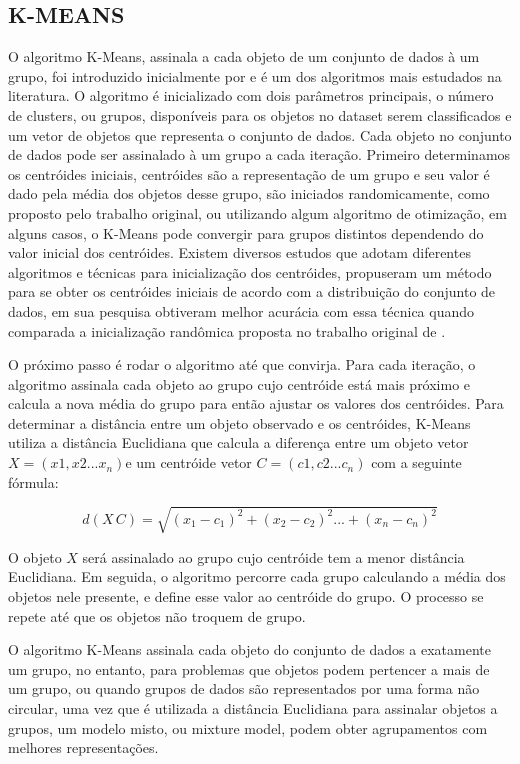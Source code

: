 \documentclass[12pt,a4paper]{article}
\begin{document}
\subsection{K-MEANS}
O algoritmo K-Means, assinala a cada objeto de um conjunto de dados à um grupo, foi introduzido inicialmente por  e é um dos algoritmos mais estudados na literatura. O algoritmo é inicializado com dois parâmetros principais, o número de clusters, ou grupos, disponíveis para os objetos no dataset serem classificados e um vetor de objetos que representa o conjunto de dados. Cada objeto no conjunto de dados pode ser assinalado à um grupo a cada iteração. Primeiro determinamos os centróides iniciais, centróides são a representação de um grupo e seu valor é dado pela média dos objetos desse grupo, são iniciados randomicamente, como proposto  pelo trabalho original, ou utilizando algum algoritmo de otimização, em alguns casos, o K-Means pode convergir para grupos distintos dependendo do valor inicial dos centróides. Existem diversos estudos que adotam diferentes algoritmos e técnicas para inicialização dos centróides,  propuseram um método  para se obter os centróides iniciais de acordo com a distribuição do conjunto de dados, em sua pesquisa obtiveram melhor acurácia com essa técnica quando comparada a inicialização randômica proposta no trabalho original de .

O próximo passo é rodar o algoritmo até que convirja. Para cada iteração, o algoritmo assinala cada objeto ao grupo cujo centróide está mais próximo e calcula a nova média do grupo para então ajustar os valores dos centróides. Para determinar a distância entre um objeto observado e os centróides, K-Means utiliza a distância Euclidiana que calcula a diferença entre um objeto vetor \(X=(x1, x2... x_n)\)e um centróide vetor \(C=(c1, c2... c_n)\) com a seguinte fórmula: 

\begin{equation}
d(X\,C) = \sqrt{(x_1 - c_1)^2 + (x_2 - c_2)^2 ... + (x_n - c_n)^2}
\end{equation}

O objeto $X$ será assinalado ao grupo cujo centróide tem a menor distância Euclidiana. Em seguida, o algoritmo percorre cada grupo calculando a média dos objetos nele presente, e define esse valor ao centróide do grupo. O processo se repete até que os objetos não troquem de grupo.

O algoritmo K-Means assinala cada objeto do conjunto de dados a exatamente um grupo, no entanto, para problemas que objetos podem pertencer a mais de um grupo, ou quando grupos de dados são representados por uma forma não circular, uma vez que é  utilizada a distância Euclidiana para assinalar objetos a grupos, um modelo misto, ou mixture model, podem obter agrupamentos com melhores representações.
\end{document}
